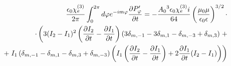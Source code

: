 %
%
%
%
\begin{equation*} \begin{aligned}
\frac{\epsilon_0 \chi_e^{(3)}}{2 \pi} \int_{0}^{2 \pi} d \varphi 
e^{-im \varphi} \frac{\partial P_\varphi^\prime}{\partial t} = 
- \frac{ {A_0}^3 \epsilon_0 \chi_e^{(3)}  i}{ 64 }
\left( \frac{\mu_0 \mu} {\epsilon_0 \epsilon} \right)^{3/2} \cdot \\ 
\cdot \left( 3 ( I_2 - I_1 )^2 \left( \frac{\partial I_2}{\partial t} - 
\frac{\partial I_1}{\partial t} \right) \left( 3 \delta_{m,-1} - 3 \delta_{m,1} - 
\delta_{m,-3} + \delta_{m,3} \right) \right. + \\
+ \left. I_1 \left( \delta_{m,-1} - \delta_{m,1} - 
\delta_{m,3} + \delta_{m,-3} \right) \left( 
I_1 \left( \frac{\partial I_2}{\partial t} - \frac{\partial I_1}{\partial t} \right) + 
2 \frac{\partial I_1}{\partial t} (I_2 - I_1) \right) \right)
\end{aligned} \end{equation*}

